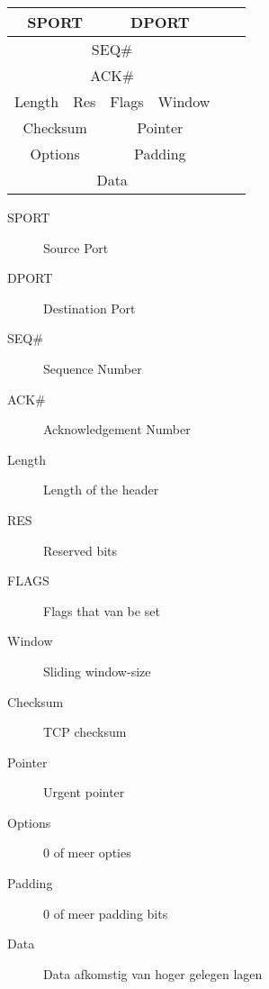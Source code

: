
\begin{tabular}{ |c|c|c|c|c|c| }
\hline
	\multicolumn{2}{|c|}{SPORT} & \multicolumn{2}{c|}{DPORT} \\
\hline
	\multicolumn{4}{|c|}{SEQ\#} \\
\hline
	\multicolumn{4}{|c|}{ACK\#} \\
\hline
	Length & Res & Flags & Window \\
\hline
	\multicolumn{2}{|c|}{Checksum} & \multicolumn{2}{c|}{Pointer} \\
\hline
	\multicolumn{2}{|c|}{Options} & \multicolumn{2}{c|}{Padding} \\
\hline
	\multicolumn{4}{|c|}{Data} \\
\hline
\end{tabular}

\begin{description}
	\item[SPORT] Source Port
	\item[DPORT] Destination Port
	\item[SEQ\#] Sequence Number
	\item[ACK\#] Acknowledgement Number
	\item[Length] Length of the header
	\item[RES] Reserved bits
	\item[FLAGS] Flags that van be set
	\item[Window] Sliding window-size
	\item[Checksum] TCP checksum
	\item[Pointer] Urgent pointer
	\item[Options] 0 of meer opties
	\item[Padding] 0 of meer padding bits
	\item[Data] Data afkomstig van hoger gelegen lagen
\end{description}

